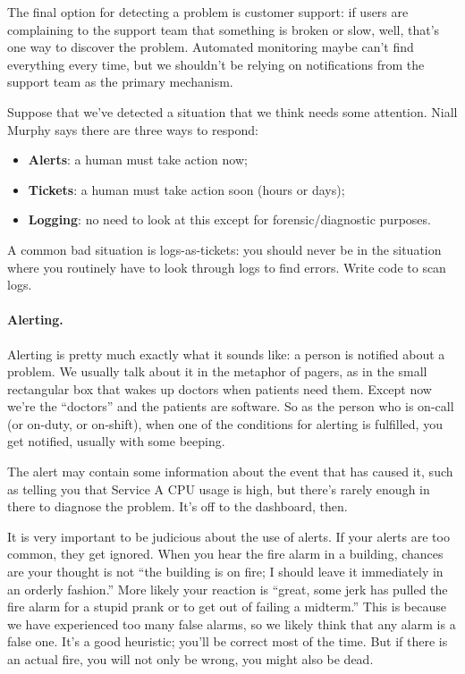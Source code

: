 The final option for detecting a problem is customer support: if users are complaining to the support team that something is broken or slow, well, that's one way to discover the problem. Automated monitoring maybe can't find everything every time, but we shouldn't be relying on notifications from the support team as the primary mechanism.

Suppose that we've detected a situation that we think needs some attention. Niall Murphy says there are three ways to respond:

\begin{itemize}
\item {\bf Alerts}: a human must take action now;
\item {\bf Tickets}: a human must take action soon (hours or days);
\item {\bf Logging}: no need to look at this except for forensic/diagnostic purposes.
\end{itemize}

A common bad situation is logs-as-tickets: you should never be in the
situation where you routinely have to look through logs to find
errors. Write code to scan logs.

\paragraph{Alerting.}
Alerting is pretty much exactly what it sounds like: a person is notified about a problem. We usually talk about it in the metaphor of pagers, as in the small rectangular box that wakes up doctors when patients need them. Except now we're the ``doctors'' and the patients are software. So as the person who is on-call (or on-duty, or on-shift), when one of the conditions for alerting is fulfilled, you get notified, usually with some beeping. 

The alert may contain some information about the event that has caused it, such as telling you that Service A CPU usage is high, but there's rarely enough in there to diagnose the problem. It's off to the dashboard, then.

It is very important to be judicious about the use of alerts. If your alerts are too common, they get ignored. When you hear the fire alarm in a building, chances are your thought is not ``the building is on fire; I should leave it immediately in an orderly fashion.'' More likely your reaction is ``great, some jerk has pulled the fire alarm for a stupid prank or to get out of failing a midterm.'' This is because we have experienced too many false alarms, so we likely think that any alarm is a false one. It's a good heuristic; you'll be correct most of the time. But if there is an actual fire, you will not only be wrong, you might also be dead.

